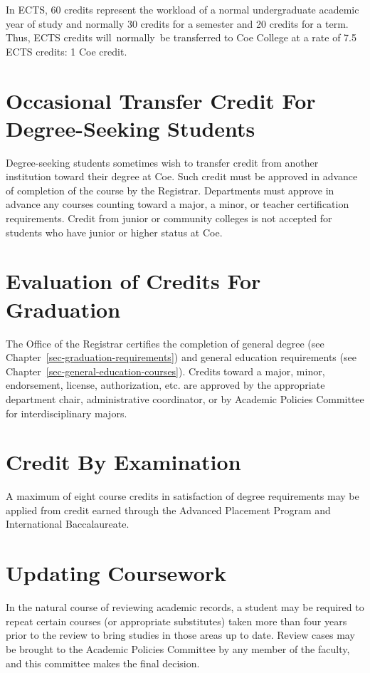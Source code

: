 \documentclass[
  letterpaper,
]{scrbook}
\begin{document}
In ECTS, 60 credits represent the workload of a normal undergraduate
academic year of study and normally 30 credits for a semester and 20
credits for a term. Thus, ECTS credits will~normally~be transferred to
Coe College at a rate of 7.5 ECTS credits: 1 Coe credit.

\section{Occasional Transfer Credit For Degree-Seeking
Students}\label{occasional-transfer-credit-for-degree-seeking-students}

Degree-seeking students sometimes wish to transfer credit from another
institution toward their degree at Coe. Such credit must be approved in
advance of completion of the course by the Registrar. Departments must
approve in advance any courses counting toward a major, a minor, or
teacher certification requirements. Credit from junior or community
colleges is not accepted for students who have junior or higher status
at Coe.

\section{Evaluation of Credits For
Graduation}\label{evaluation-of-credits-for-graduation}

The Office of the Registrar certifies the completion of general degree
(see Chapter~\ref{sec-graduation-requirements}) and general education
requirements (see Chapter~\ref{sec-general-education-courses}). Credits
toward a major, minor, endorsement, license, authorization, etc. are
approved by the appropriate department chair, administrative
coordinator, or by Academic Policies Committee for interdisciplinary
majors.

\section{Credit By Examination}\label{credit-by-examination}

A maximum of eight course credits in satisfaction of degree requirements
may be applied from credit earned through the Advanced Placement Program
and International Baccalaureate.

\section{Updating Coursework}\label{updating-coursework}

In the natural course of reviewing academic records, a student may be
required to repeat certain courses (or appropriate substitutes) taken
more than four years prior to the review to bring studies in those areas
up to date. Review cases may be brought to the Academic Policies
Committee by any member of the faculty, and this committee makes the
final decision.
\end{document}

